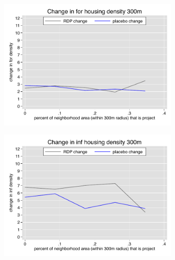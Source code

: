 \documentclass[12pt]{article}
\begin{document}
\begin{figure}
        \begin{subfigure}[b]{0.495\textwidth}
            \centering
            \includegraphics[width=\textwidth,trim={0.3cm .3cm 0.1cm 0cm}, clip=true]{figures/change_for_300_total.pdf}
        \end{subfigure}
        \hfill
        \begin{subfigure}[b]{0.495\textwidth}  
            \centering 
            \includegraphics[width=\textwidth,trim={0.3cm .3cm 0.1cm 0cm}, clip=true]{figures/change_inf_300_total.pdf}
        \end{subfigure}
        \vspace{-6mm}
  \end{figure} 
\end{document}
